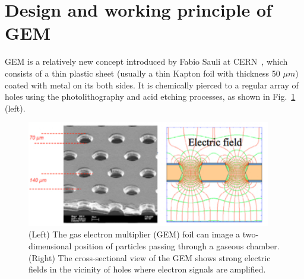 \section{Design and working principle of GEM} %
\label{sec:design_and_working_principle_of_gem}

GEM is a relatively new concept introduced by Fabio Sauli at CERN~\cite{Sauli1997}, which consists of a thin plastic sheet (usually a thin Kapton foil with thickness 50 $\mu m$) coated with metal on its both sides. It is chemically pierced to a regular array of holes using the photolithography and acid etching processes, as shown in Fig.~\ref{fig:gem} (left).
\begin{figure}[!htbp]
    \centering
    \includegraphics[width=0.95\textwidth]{figures/GEM/KEKDTP3.jpg}
    \caption{(Left) The gas electron multiplier (GEM) foil can image a two-dimensional position of particles passing through a gaseous chamber. (Right) The cross-sectional view of the GEM shows strong electric fields in the vicinity of holes where electron signals are amplified.}
    \label{fig:gem}
\end{figure}

